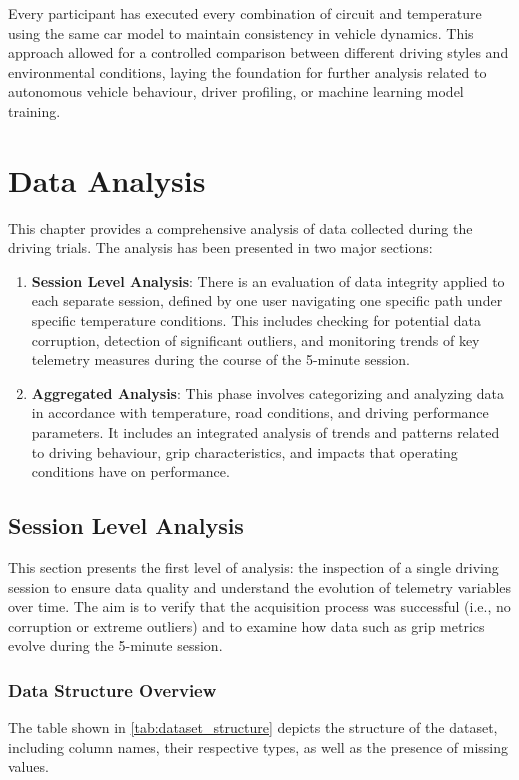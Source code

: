 \documentclass[a4paper,final,12pt]{report}
\begin{document}
Every participant has executed every combination of circuit and temperature  using the same car model to maintain consistency in vehicle dynamics. This approach allowed for a controlled comparison between different driving styles and environmental conditions, laying the foundation for further analysis related to autonomous vehicle behaviour, driver profiling, or machine learning model training.

\section{Data Analysis}
This chapter provides a comprehensive analysis of data collected during the driving trials. The analysis has been presented in two major sections:

\begin{enumerate}
    \item \textbf{Session Level Analysis}: There is an evaluation of data integrity applied to each separate session, defined by one user navigating one specific path under specific temperature conditions. This includes checking for potential data corruption, detection of significant outliers, and monitoring trends of key telemetry measures during the course of the 5-minute session.
    \item \textbf{Aggregated Analysis}: This phase involves categorizing and analyzing data in accordance with temperature, road conditions, and driving performance parameters. It includes an integrated analysis of trends and patterns related to driving behaviour, grip characteristics, and impacts that operating conditions have on performance.
\end{enumerate}

\newpage

\subsection{Session Level Analysis}
This section presents the first level of analysis: the inspection of a single driving session to ensure data quality and understand the evolution of telemetry variables over time. The aim is to verify that the acquisition process was successful (i.e., no corruption or extreme outliers) and to examine how data such as grip metrics evolve during the 5-minute session.\\

\subsubsection{Data Structure Overview}
The table shown in \ref{tab:dataset_structure} depicts the structure of the dataset, including column names, their respective types, as well as the presence of missing values.
\end{document}
